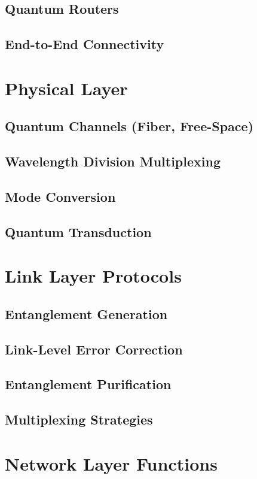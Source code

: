 \documentclass[12pt,a4paper]{book}
\begin{document}
\subsection{Quantum Routers}
\subsection{End-to-End Connectivity}

\section{Physical Layer}
\subsection{Quantum Channels (Fiber, Free-Space)}
\subsection{Wavelength Division Multiplexing}
\subsection{Mode Conversion}
\subsection{Quantum Transduction}

\section{Link Layer Protocols}
\subsection{Entanglement Generation}
\subsection{Link-Level Error Correction}
\subsection{Entanglement Purification}
\subsection{Multiplexing Strategies}

\section{Network Layer Functions}
\end{document}
